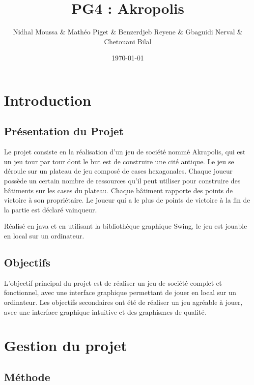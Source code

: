 \documentclass{article}
\title{PG4 : Akropolis}
\author{Nidhal Moussa \& Mathéo Piget \& Benzerdjeb Reyene \& Gbaguidi Nerval \& Chetouani Bilal
}
\date{\today}
\begin{document}
    \maketitle

    \tableofcontents

    \newpage

    \section{Introduction}\label{sec:introduction}

    \subsection{Présentation du Projet}\label{subsec:presentation-du-projet}
    Le projet consiste en la réalisation d'un jeu de société nommé Akrapolis, qui est un jeu tour par tour dont le but est de construire une cité antique.
    Le jeu se déroule sur un plateau de jeu composé de cases hexagonales.
    Chaque joueur possède un certain nombre de ressources qu'il peut utiliser pour construire des bâtiments sur les cases du plateau.
    Chaque bâtiment rapporte des points de victoire à son propriétaire.
    Le joueur qui a le plus de points de victoire à la fin de la partie est déclaré vainqueur.

    \newline
    Réalisé en java et en utilisant la bibliothèque graphique Swing, le jeu est jouable en local sur un ordinateur.

    \subsection{Objectifs}\label{subsec:obectifs}

    L'objectif principal du projet est de réaliser un jeu de société complet et fonctionnel, avec une interface graphique permettant de jouer en local sur un ordinateur.
    Les objectifs secondaires ont été de réaliser un jeu agréable à jouer, avec une interface graphique intuitive et des graphismes de qualité.

    \section{Gestion du projet}\label{sec:gestion-du-projet}

    \subsection{Méthode}\label{subsec:methode}
\end{document}
